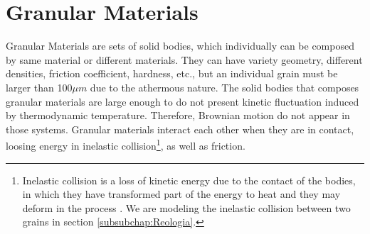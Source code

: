 
\chapter{Granular Materials}
\label{chap:Trabalhos-Relacionados}



    Granular Materials are sets of solid bodies, which individually can be composed by same material or different materials. They can have variety geometry, different densities, friction coefficient, hardness, etc., but an individual grain must be larger than 100$\mu m$ \cite{Sands_Powders_and_Grains} due to the athermous nature. The solid bodies that composes granular materials are large enough to do not present kinetic fluctuation induced by thermodynamic temperature. Therefore, Brownian motion do not appear in those systems. Granular materials interact each other when they are in contact, loosing energy in inelastic collision\footnote{Inelastic collision is a loss of kinetic energy due to the contact of the bodies, in which they have transformed part of the energy to heat and they may deform in the process \cite{Halliday}. We are modeling the inelastic collision between two grains in section \ref{subsubchap:Reologia}.}, as well as friction.

    
